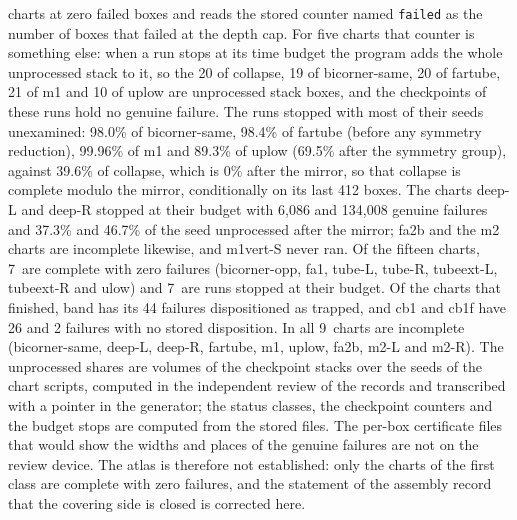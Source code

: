 \documentclass[11pt]{article}
\theoremstyle{definition}
\theoremstyle{remark}
\newcommand{\numAtlasComplete}{7}
\newcommand{\numAtlasStopped}{7}
\newcommand{\numAtlasIncomplete}{9}
\begin{document}
charts at zero failed boxes and reads the stored counter named \texttt{failed} as the number of boxes that failed at the depth cap. For five charts that counter is something else: when a run stops at its
time budget the program adds the whole unprocessed stack to it, so the 20 of collapse, 19 of bicorner-same, 20 of fartube, 21 of m1 and 10 of uplow are unprocessed stack boxes, and the checkpoints
of these runs hold no genuine failure. The runs stopped with most of their seeds unexamined: 98.0\% of bicorner-same, 98.4\% of fartube (before any symmetry reduction), 99.96\% of m1 and 89.3\% of uplow (69.5\% after the symmetry group),
against 39.6\% of collapse, which is 0\% after the mirror, so that collapse is complete modulo the mirror, conditionally on its last 412 boxes. The charts deep-L and deep-R stopped at their budget with 6,086
and 134,008 genuine failures and 37.3\% and 46.7\% of the seed unprocessed after the mirror; fa2b and the m2 charts are incomplete likewise, and m1vert-S never ran. Of the fifteen charts, \numAtlasComplete\
are complete with zero failures (bicorner-opp, fa1, tube-L, tube-R, tubeext-L, tubeext-R and ulow) and \numAtlasStopped\ are runs stopped at their budget. Of the charts that finished, band has its 44
failures dispositioned as trapped, and cb1 and cb1f have 26 and 2 failures with no stored disposition. In all \numAtlasIncomplete\ charts are incomplete (bicorner-same, deep-L, deep-R, fartube, m1, uplow, fa2b,
m2-L and m2-R). The unprocessed shares are volumes of the checkpoint stacks over the seeds of the chart scripts, computed in the independent review of the records and transcribed with a pointer in the generator;
the status classes, the checkpoint counters and the budget stops are computed from the stored files. The per-box certificate files that would show the widths and places of the genuine failures are not on the review device.
The atlas is therefore not established: only the charts of the first class are complete with zero failures, and the statement of the assembly record that the covering side is closed is corrected here.
\end{document}

